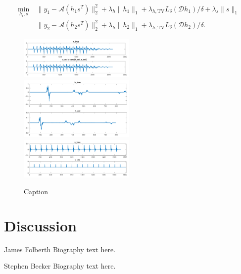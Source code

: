 \documentclass[journal]{IEEEtran}
\begin{document}
\begin{align*}
   \min_{h_i,s} ~&\|y_1 - \mathcal{A}(h_1s^T)\|_2^2 + \lambda_{h}\|h_1\|_1 + \lambda_{h,\text{TV}}L_\delta(\mathcal{D}h_1)/\delta + \lambda_s\|s\|_1\\
                 &\|y_2 - \mathcal{A}(h_2s^T)\|_2^2 + \lambda_{h}\|h_2\|_1 + \lambda_{h,\text{TV}}L_\delta(\mathcal{D}h_2)/\delta.
\end{align*}


\begin{figure}
   \centering
   \includegraphics[width=0.5\textwidth]{figures/bce_rec_003_x_trim.pdf}
   \includegraphics[width=0.5\textwidth]{figures/bce_rec_003_h_trim.pdf}
   \includegraphics[width=0.5\textwidth]{figures/bce_rec_003_s_trim.pdf}
   \caption{Caption}
   \label{fig:bce_rec}
\end{figure}




\section{Discussion}







\begin{IEEEbiographynophoto}{James Folberth}
Biography text here.
\end{IEEEbiographynophoto}

\begin{IEEEbiographynophoto}{Stephen Becker}
Biography text here.
\end{IEEEbiographynophoto}
\end{document}
